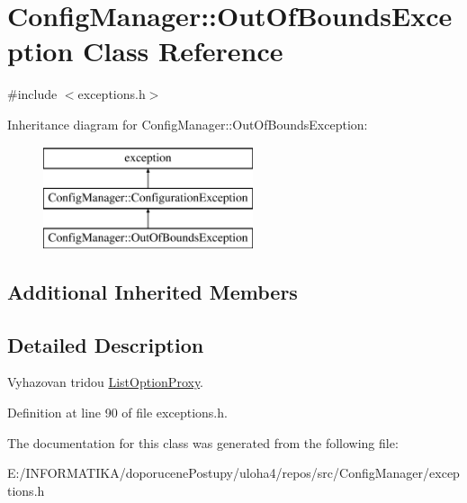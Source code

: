\hypertarget{class_config_manager_1_1_out_of_bounds_exception}{}\section{Config\+Manager\+:\+:Out\+Of\+Bounds\+Exception Class Reference}
\label{class_config_manager_1_1_out_of_bounds_exception}


{\ttfamily \#include $<$exceptions.\+h$>$}

Inheritance diagram for Config\+Manager\+:\+:Out\+Of\+Bounds\+Exception\+:\begin{figure}[H]
\begin{center}
\leavevmode
\includegraphics[height=3.000000cm]{class_config_manager_1_1_out_of_bounds_exception}
\end{center}
\end{figure}
\subsection*{Additional Inherited Members}


\subsection{Detailed Description}
Vyhazovan tridou \hyperlink{class_config_manager_1_1_list_option_proxy}{List\+Option\+Proxy}. 

Definition at line 90 of file exceptions.\+h.



The documentation for this class was generated from the following file\+:\begin{DoxyCompactItemize}
\item 
E\+:/\+I\+N\+F\+O\+R\+M\+A\+T\+I\+K\+A/doporucene\+Postupy/uloha4/repos/src/\+Config\+Manager/exceptions.\+h\end{DoxyCompactItemize}
